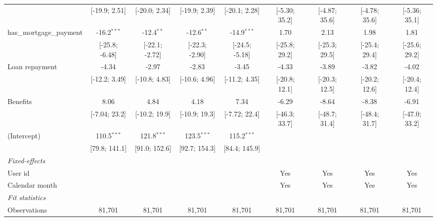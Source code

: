 \begin{table}[htbp]
\begin{threeparttable}[b]
\begin{tabular}{lcccccccc}
                                   & [-19.9; 2.51]   & [-20.0; 2.34]   & [-19.9; 2.39]   & [-20.1; 2.28]   & [-5.30; 35.2]   & [-4.87; 35.6]   & [-4.78; 35.6]   & [-5.36; 35.1]\\   
         has\_mortgage\_payment    & -16.2$^{***}$   & -12.4$^{**}$    & -12.6$^{**}$    & -14.9$^{***}$   & 1.70            & 2.13            & 1.98            & 1.81\\   
                                   & [-25.8; -6.48]  & [-22.1; -2.72]  & [-22.3; -2.90]  & [-24.5; -5.18]  & [-25.8; 29.2]   & [-25.3; 29.5]   & [-25.4; 29.4]   & [-25.6; 29.2]\\   
         Loan repayment            & -4.34           & -2.97           & -2.83           & -3.45           & -4.33           & -3.89           & -3.82           & -4.02\\   
                                   & [-12.2; 3.49]   & [-10.8; 4.83]   & [-10.6; 4.96]   & [-11.2; 4.35]   & [-20.8; 12.1]   & [-20.3; 12.5]   & [-20.2; 12.6]   & [-20.4; 12.4]\\   
         Benefits                  & 8.06            & 4.84            & 4.18            & 7.34            & -6.29           & -8.64           & -8.38           & -6.91\\   
                                   & [-7.04; 23.2]   & [-10.2; 19.9]   & [-10.9; 19.3]   & [-7.72; 22.4]   & [-46.3; 33.7]   & [-48.7; 31.4]   & [-48.4; 31.7]   & [-47.0; 33.2]\\   
         (Intercept)               & 110.5$^{***}$   & 121.8$^{***}$   & 123.5$^{***}$   & 115.2$^{***}$   &                 &                 &                 &   \\   
                                   & [79.8; 141.1]   & [91.0; 152.6]   & [92.7; 154.3]   & [84.4; 145.9]   &                 &                 &                 &   \\   
         \midrule
         \emph{Fixed-effects}\\
         User id                   &                 &                 &                 &                 & Yes             & Yes             & Yes             & Yes\\  
         Calendar month            &                 &                 &                 &                 & Yes             & Yes             & Yes             & Yes\\  
         \midrule
         \emph{Fit statistics}\\
         Observations              & 81,701          & 81,701          & 81,701          & 81,701          & 81,701          & 81,701          & 81,701          & 81,701\\  

\end{tabular}
\end{threeparttable}
\end{table}
